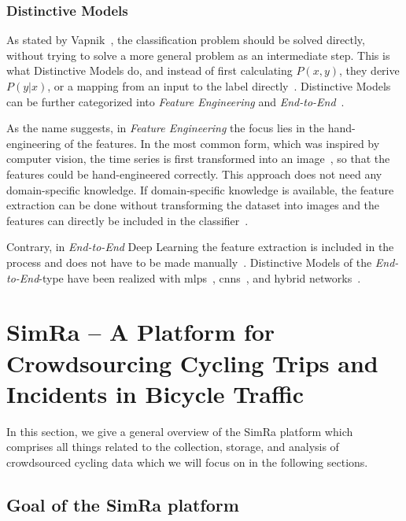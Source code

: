 \subsubsection*{Distinctive Models}
As stated by Vapnik~\cite{vapnik1998statistical}, the classification problem should be solved directly, without trying to solve a more general problem as an intermediate step.
This is what Distinctive Models do, and instead of first calculating $P(x,y)$, they derive $P(y|x)$, or a mapping from an input to the label directly~\cite{ng2001discriminative}.
Distinctive Models can be further categorized into \textit{Feature Engineering} and \textit{End-to-End}~\cite{ismail2019deep}.

As the name suggests, in \textit{Feature Engineering} the focus lies in the hand-engineering of the features.
In the most common form, which was inspired by computer vision, the time series is first transformed into an image~\cite{wang2015encoding,hatami2018classification,tripathy2018use}, so that the features could be hand-engineered correctly.
This approach does not need any domain-specific knowledge.
If domain-specific knowledge is available, the feature extraction can be done without transforming the dataset into images and the features can directly be included in the classifier~\cite{uemura2018feasibility,ignatov2018real}.

Contrary, in \textit{End-to-End} Deep Learning the feature extraction is included in the process and does not have to be made manually~\cite{nweke2018deep}.
Distinctive Models of the \textit{End-to-End}-type have been realized with \acp{mlp}~\cite{wang2017time,geng2019cost}, \acp{cnn}~\cite{che2017boosting,ismail2018evaluating,liu2018time}, and hybrid networks~\cite{lin2017gcrnn,serra2018towards}.


\section{SimRa -- A Platform for Crowdsourcing Cycling Trips and Incidents in Bicycle Traffic}
\label{sec:simra}
In this section, we give a general overview of the SimRa platform which comprises all things related to the collection, storage, and analysis of crowdsourced cycling data which we will focus on in the following sections.

\subsection{Goal of the SimRa platform}
\label{subsec:simra}


